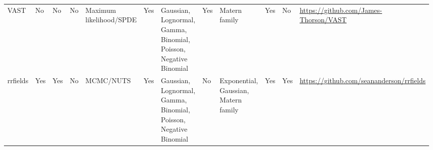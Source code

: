 \documentclass[12pt,english]{article}
\begin{document}
\begin{landscape}
\begin{table}
\begin{minipage}{\textwidth}
\begin{scriptsize}
\begin{tabular}{llllL{2cm}lL{2.4cm}lL{2.0cm}llL{2.0cm}}
        VAST     & No             & No      & No      & Maximum likelihood/SPDE     & Yes        & Gaussian, Lognormal, Gamma, Binomial, Poisson, Negative Binomial  & Yes      & Matern family                                     & Yes                   & No        & \url{https://github.com/James-Thorson/VAST}                      \\
        rrfields & Yes            & Yes     & No      & MCMC/NUTS                   & Yes        & Gaussian, Lognormal, Gamma, Binomial, Poisson, Negative Binomial  & No       & Exponential, Gaussian, Matern family              & Yes                   & Yes       & \url{https://github.com/seananderson/rrfields}                  \\
        \bottomrule
      \end{tabular}
    \end{scriptsize}

  \end{minipage}
  \end{table}
\end{landscape}
\end{document}
